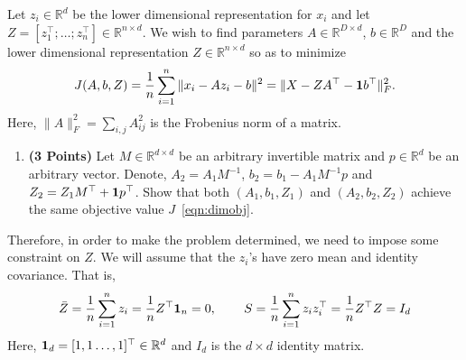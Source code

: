 \documentclass[a4paper]{article}
\newcommand*{\one}{{\bf 1}}
\newcommand{\Zbar}{\bar{Z}}
\theoremstyle{definition}
\newcommand{\RR}{\mathbb{R}}
\begin{document}
Let $z_i\in \RR^d$ be the lower dimensional representation for $x_i$ and
let $Z = [z_1^\top; \dots; z_n^\top] \in \RR^{n\times d}$.
We wish to find parameters $A \in \RR^{D\times d}$, $b\in\RR^D$ and the lower
dimensional representation $Z\in \RR^{n\times d}$ so as to minimize 
\begin{equation}
J(A,b,Z) = \frac{1}{n} \sum_{i=1}^n \|x_i - Az_i - b\|^2 = \| X - ZA^\top - \one b^\top\|_F^2.
\label{eqn:dimobj}
\end{equation}
Here, $\|A\|^2_F = \sum_{i,j} A_{ij}^2$ is the Frobenius norm of a matrix.


\begin{enumerate}
\item \textbf{(3 Points)}
Let $M\in\RR^{d\times d}$ be an arbitrary invertible matrix and $p\in\RR^{d}$ be an arbitrary vector.
Denote, $A_2 = A_1M^{-1}$, $b_2 = b_1- A_1M^{-1}p$ and $Z_2 = Z_1 M^\top +
\one p^\top$.
Show that both
$(A_1, b_1, Z_1)$ and $(A_2, b_2, Z_2)$ achieve the same objective value $J$~\eqref{eqn:dimobj}.
\end{enumerate}

Therefore, in order to make the problem determined, we need to impose some
constraint on $Z$. We will assume that the $z_i$'s have zero mean and identity covariance.
That is,
\begin{align*}
\Zbar = \frac{1}{n} \sum_{i=1}^n z_i =\frac{1}{n} Z^\top {\bf 1}_n = 0, \hspace{0.3in} 
S = \frac{1}{n} \sum_{i=1}^n z_i z_i^\top 
= \frac{1}{n} Z^\top Z
= I_d
\end{align*}
Here, ${\bf 1}_d = [1, 1 \dots, 1]^\top \in\RR^d$ and $I_d$  is the $d\times d$ identity matrix.\\
\end{document}
